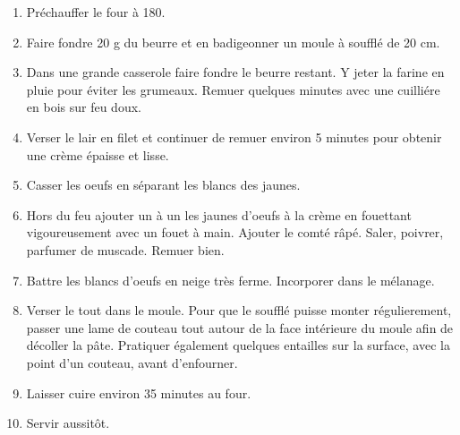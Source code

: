 
\begin{ingredients}
\end{ingredients}


\begin{recipe}
  \begin{enumerate}

  \item Pr\'echauffer le four \`a 180\C.

  \item Faire fondre 20 g du beurre et en badigeonner un moule \`a
    souffl\'e de 20 cm.

  \item Dans une grande casserole faire fondre le beurre restant.  Y
    jeter la farine en pluie pour \'eviter les grumeaux.  Remuer
    quelques minutes avec une cuilli\'ere en bois sur feu doux.

  \item Verser le lair en filet et continuer de remuer environ 5
    minutes pour obtenir une cr\`eme \'epaisse et lisse.

  \item Casser les oeufs en s\'eparant les blancs des jaunes.

  \item Hors du feu ajouter un \`a un les jaunes d'oeufs \`a la
    cr\`eme en fouettant vigoureusement avec un fouet \`a main.
    Ajouter le comt\'e r\^ap\'e.  Saler, poivrer, parfumer de
    muscade.  Remuer bien.

  \item Battre les blancs d'oeufs en neige tr\`es ferme.  Incorporer
    dans le m\'elanage.

  \item Verser le tout dans le moule.  Pour que le souffl\'e puisse
    monter r\'egulierement, passer une lame de couteau tout autour de
    la face int\'erieure du moule afin de d\'ecoller la p\^ate.
    Pratiquer \'egalement quelques entailles sur la surface, avec la
    point d'un couteau, avant d'enfourner.

  \item Laisser cuire environ 35 minutes au four.

  \item Servir aussit\^ot.

  \end{enumerate}
\end{recipe}
